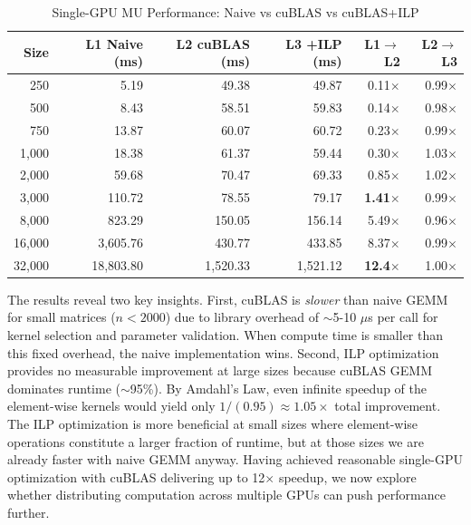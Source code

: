 \documentclass[11pt]{article}
\begin{document}
\begin{table}[h]
\centering
\caption{Single-GPU MU Performance: Naive vs cuBLAS vs cuBLAS+ILP}
\label{tab:mu_single}
\begin{tabular}{@{}rrrrrr@{}}
\toprule
Size & L1 Naive (ms) & L2 cuBLAS (ms) & L3 +ILP (ms) & L1$\to$L2 & L2$\to$L3 \\ \midrule
250 & 5.19 & 49.38 & 49.87 & 0.11$\times$ & 0.99$\times$ \\
500 & 8.43 & 58.51 & 59.83 & 0.14$\times$ & 0.98$\times$ \\
750 & 13.87 & 60.07 & 60.72 & 0.23$\times$ & 0.99$\times$ \\
1,000 & 18.38 & 61.37 & 59.44 & 0.30$\times$ & 1.03$\times$ \\
2,000 & 59.68 & 70.47 & 69.33 & 0.85$\times$ & 1.02$\times$ \\
3,000 & 110.72 & 78.55 & 79.17 & \textbf{1.41$\times$} & 0.99$\times$ \\
8,000 & 823.29 & 150.05 & 156.14 & 5.49$\times$ & 0.96$\times$ \\
16,000 & 3,605.76 & 430.77 & 433.85 & 8.37$\times$ & 0.99$\times$ \\
32,000 & 18,803.80 & 1,520.33 & 1,521.12 & \textbf{12.4$\times$} & 1.00$\times$ \\ \bottomrule
\end{tabular}
\end{table}

The results reveal two key insights. First, cuBLAS is \textit{slower} than naive GEMM for small matrices ($n < 2000$) due to library overhead of $\sim$5-10 $\mu$s per call for kernel selection and parameter validation. When compute time is smaller than this fixed overhead, the naive implementation wins. Second, ILP optimization provides no measurable improvement at large sizes because cuBLAS GEMM dominates runtime ($\sim$95\%). By Amdahl's Law, even infinite speedup of the element-wise kernels would yield only $1/(0.95) \approx 1.05\times$ total improvement. The ILP optimization is more beneficial at small sizes where element-wise operations constitute a larger fraction of runtime, but at those sizes we are already faster with naive GEMM anyway. Having achieved reasonable single-GPU optimization with cuBLAS delivering up to 12$\times$ speedup, we now explore whether distributing computation across multiple GPUs can push performance further.

\end{document}

